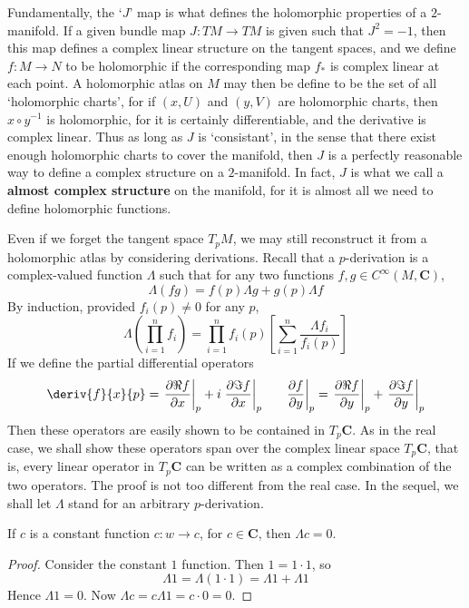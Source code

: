 Fundamentally, the `$J$' map is what defines the holomorphic properties of a $2$-manifold. If a given bundle map $J:TM \to TM$ is given such that $J^2 = -1$, then this map defines a complex linear structure on the tangent spaces, and we define $f: M \to N$ to be holomorphic if the corresponding map $f_*$ is complex linear at each point. A holomorphic atlas on $M$ may then be define to be the set of all `holomorphic charts', for if $(x,U)$ and $(y,V)$ are holomorphic charts, then $x \circ y^{-1}$ is holomorphic, for it is certainly differentiable, and the derivative is complex linear. Thus as long as $J$ is `consistant', in the sense that there exist enough holomorphic charts to cover the manifold, then $J$ is a perfectly reasonable way to define a complex structure on a $2$-manifold. In fact, $J$ is what we call a {\bf almost complex structure} on the manifold, for it is almost all we need to define holomorphic functions.

Even if we forget the tangent space $T_p M$, we may still reconstruct it from a holomorphic atlas by considering derivations. Recall that a $p$-derivation is a complex-valued function $\Lambda$ such that for any two functions $f,g \in C^\infty(M,\mathbf{C})$,
%
\[ \Lambda (fg) = f(p) \Lambda g + g(p) \Lambda f \]
%
By induction, provided $f_i(p) \neq 0$ for any $p$,
%
\[ \Lambda \left(\prod_{i = 1}^n f_i \right) = \prod_{i = 1}^n f_i(p) \left[\sum_{i = 1}^n \frac{\Lambda f_i}{f_i(p)}\right] \]
%
If we define the partial differential operators
%
\[ \deriv{f}{x}{p} = \left.\frac{\partial \Re f}{\partial x}\right|_p + i \left.\frac{\partial \Im f}{\partial x}\right|_p\ \ \ \ \ \left.\frac{\partial f}{\partial y}\right|_p = \left.\frac{\partial \Re f}{\partial y}\right|_p + \left.\frac{\partial \Im f}{\partial y}\right|_p \]
%
Then these operators are easily shown to be contained in $T_p \mathbf{C}$. As in the real case, we shall show these operators span over the complex linear space $T_p \mathbf{C}$, that is, every linear operator in $T_p \mathbf{C}$ can be written as a complex combination of the two operators. The proof is not too different from the real case. In the sequel, we shall let $\Lambda$ stand for an arbitrary $p$-derivation.

\begin{lemma}
    If $c$ is a constant function $c: w \to c$, for $c \in \mathbf{C}$, then $\Lambda c = 0$.
\end{lemma}
\begin{proof}
    Consider the constant $1$ function. Then $1 = 1 \cdotp 1$, so
    \[ \Lambda 1 = \Lambda (1 \cdotp 1) = \Lambda 1 + \Lambda 1 \]
    Hence $\Lambda 1 = 0$. Now $\Lambda c = c \Lambda 1 = c \cdotp 0 = 0$.
\end{proof}


